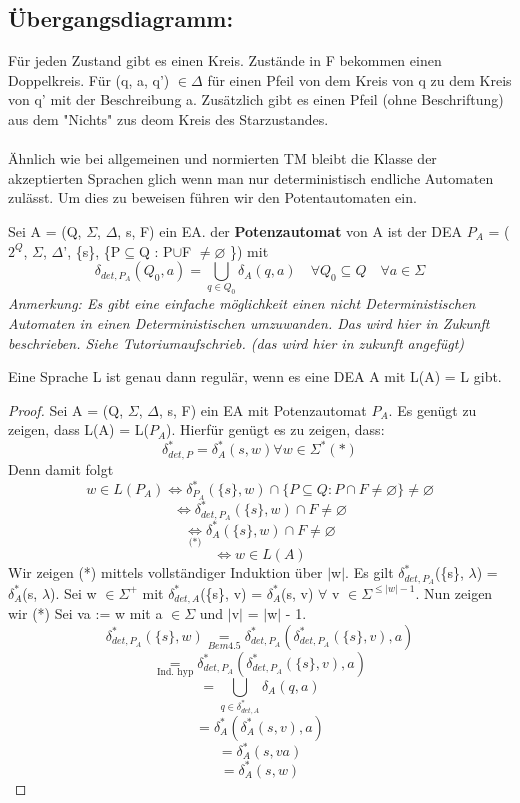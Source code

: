 \subsection*{Übergangsdiagramm:}
Für jeden Zustand gibt es einen Kreis. Zustände in F bekommen einen Doppelkreis. Für (q, a, q') $\in \Delta$ für einen Pfeil von dem Kreis von q zu dem Kreis von q' mit der Beschreibung a. Zusätzlich gibt es einen Pfeil (ohne Beschriftung) aus dem "Nichts" zus deom Kreis des Starzustandes.\\\\
Ähnlich wie bei allgemeinen und normierten TM bleibt die Klasse der akzeptierten Sprachen glich wenn man nur deterministisch endliche Automaten zulässt. Um dies zu beweisen führen wir den Potentautomaten ein.

Sei A = (Q, $\Sigma$, $\Delta$, s, F) ein EA. der \textbf{Potenzautomat} von A ist der DEA $P_{A}$ = ($2^{Q}$, $\Sigma$, $\Delta$', \{s\}, \{P$\subseteq$Q : P$\cup$F $\neq \varnothing $ \}) mit \[\delta_{det, P_{A}}(Q_{0}, a) = \bigcup\limits_{q \in Q_0} \delta_A (q, a) \quad \forall Q_0 \subseteq Q \quad \forall a \in \Sigma \] 
\textit{Anmerkung: Es gibt eine einfache möglichkeit einen nicht Deterministischen Automaten in einen Deterministischen umzuwanden. Das wird hier in Zukunft beschrieben. Siehe Tutoriumaufschrieb. (das wird hier in zukunft angefügt)}

Eine Sprache L ist genau dann regulär, wenn es eine DEA A mit L(A) = L gibt. 

\begin{proof}
    Sei A = (Q, $\Sigma$, $\Delta$, s, F) ein EA mit Potenzautomat $P_{A}$. Es genügt zu zeigen, dass L(A) = L($P_{A}$). Hierfür genügt es zu zeigen, dass:
    \[\delta_{det,P}^{*} = \delta_{A}^{*}(s, w) \forall w \in \Sigma^{*} (*)\]
    Denn damit folgt
    \[w \in  L (P_{A}) \Leftrightarrow \delta_{P_{A}}^{*}(\{s\}, w) \cap \{P\subseteq Q : P\cap F \neq \varnothing \} \neq \varnothing \] 
    \[\Leftrightarrow \delta_{det, P_{A}}^{*}(\{s\}, w) \cap F \neq \varnothing \]
    \[\underset{\text{(*)}}{\Leftrightarrow } \delta_{A}^{*}(\{s\}, w) \cap F \neq \varnothing \]
    \[\Leftrightarrow w \in L(A)\] Wir zeigen (*) mittels vollständiger Induktion über $\lvert$w$\rvert$. Es gilt $\delta_{det, P_{A}}^{*}$(\{s\}, $\lambda$) = $\delta_{A}^{*}$(s, $\lambda$). Sei w $\in \Sigma^{+}$ mit $\delta_{det, A}^{*}$(\{s\}, v) = $\delta_{A}^{*}$(s, v) $\forall$ v $\in \Sigma^{\leq \lvert w \rvert - 1}$. Nun zeigen wir (*) Sei va := w mit a $\in \Sigma$ und $\lvert$v$\rvert$ = $\lvert$w$\rvert$ - 1.
    \[\delta_{det, P_{A}}^{*} (\{s\}, w) \underset{\hyperref[subsec:4.5]{Bem 4.5}}{=} \delta_{det, P_{A}}^{*} (\delta_{det, P_{A}}^{*}(\{s\}, v), a)\]
    \[\underset{\text{Ind. hyp}}{=} \delta_{det, P_{A}}^{*}(\delta_{det, P_{A}}^{*}(\{s\}, v), a)\]
    \[ = \bigcup \limits_{q \in \delta_{det, A}^{*}}\delta_{A}(q, a)\]
    \[ = \delta_{A}^{*}(\delta_{A}^{*}(s, v), a)\]
    \[ = \delta_{A}^{*}(s, va)\]
    \[ = \delta_{A}^{*}(s, w)\]
\end{proof}